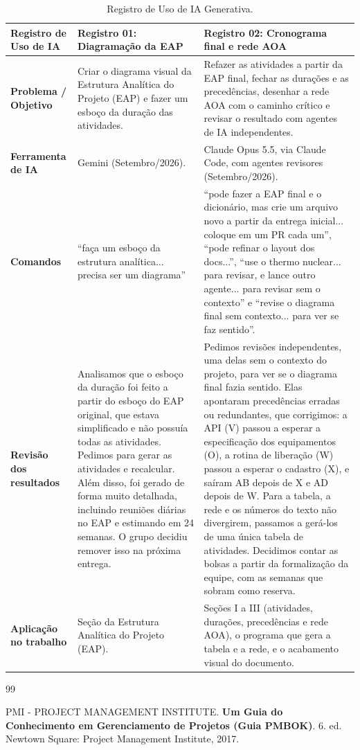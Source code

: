 \documentclass[a4paper]{article}
\begin{document}
\begin{table}[H]
    \centering
    \renewcommand{\arraystretch}{1.5}
    \small
    \begin{tabular}{|>{\raggedright\arraybackslash}p{3cm}|p{6cm}|p{6cm}|}
        \hline
        \rowcolor{eapC}
        \textbf{Registro de Uso de IA} & \textbf{Registro 01: Diagramação da EAP} & \textbf{Registro 02: Cronograma final e rede AOA} \\
        \hline
        \textbf{Problema / Objetivo} & Criar o diagrama visual da Estrutura Analítica do Projeto (EAP) e fazer um esboço da duração das atividades. & Refazer as atividades a partir da EAP final, fechar as durações e as precedências, desenhar a rede AOA com o caminho crítico e revisar o resultado com agentes de IA independentes. \\
        \hline
        \textbf{Ferramenta de IA} & Gemini (Setembro/2026). & Claude Opus 5.5, via Claude Code, com agentes revisores (Setembro/2026). \\
        \hline
        \textbf{Comandos} & \enquote{faça um esboço da estrutura analítica... precisa ser um diagrama} & \enquote{pode fazer a EAP final e o dicionário, mas crie um arquivo novo a partir da entrega inicial... coloque em um PR cada um}, \enquote{pode refinar o layout dos docs...}, \enquote{use o thermo nuclear... para revisar, e lance outro agente... para revisar sem o contexto} e \enquote{revise o diagrama final sem contexto... para ver se faz sentido}. \\
        \hline
        \textbf{Revisão dos resultados} & Analisamos que o esboço da duração foi feito a partir do esboço do EAP original, que estava simplificado e não possuía todas as atividades. Pedimos para gerar as atividades e recalcular. Além disso, foi gerado de forma muito detalhada, incluindo reuniões diárias no EAP e estimando em 24 semanas. O grupo decidiu remover isso na próxima entrega. & Pedimos revisões independentes, uma delas sem o contexto do projeto, para ver se o diagrama final fazia sentido. Elas apontaram precedências erradas ou redundantes, que corrigimos: a API (V) passou a esperar a especificação dos equipamentos (O), a rotina de liberação (W) passou a esperar o cadastro (X), e saíram AB depois de X e AD depois de W. Para a tabela, a rede e os números do texto não divergirem, passamos a gerá-los de uma única tabela de atividades. Decidimos contar as bolsas a partir da formalização da equipe, com as semanas que sobram como reserva. \\
        \hline
        \textbf{Aplicação no trabalho} & Seção da Estrutura Analítica do Projeto (EAP). & Seções I a III (atividades, durações, precedências e rede AOA), o programa que gera a tabela e a rede, e o acabamento visual do documento. \\
        \hline
    \end{tabular}
    \caption{Registro de Uso de IA Generativa.}
    \label{tab:uso_ia}
\end{table}

\begin{thebibliography}{99}

PMI - PROJECT MANAGEMENT INSTITUTE. \textbf{Um Guia do Conhecimento em Gerenciamento de Projetos (Guia PMBOK)}. 6. ed. Newtown Square: Project Management Institute, 2017.

\end{thebibliography}
\end{document}
